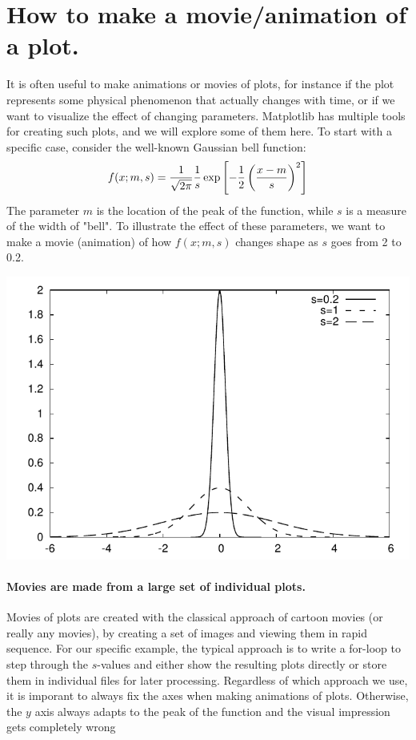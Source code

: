 \documentclass[graybox,envcountchap,sectrefs,final]{svmonodo}
\begin{document}
\section{How to make a movie/animation of a plot.}
It is often useful to make animations or movies of plots, for instance if the plot represents some physical
phenomenon that actually changes with time, or if we want to visualize the effect of changing
parameters. Matplotlib has multiple tools for creating such plots, and we will explore some of them here.
To start with a specific case, consider the well-known Gaussian bell function:
\[ f(x; m, s) = {1\over\sqrt{2\pi}}{1\over s}\exp{\left[-{1\over2}\left({x-m\over s}\right)^2\right]} \]
The parameter $m$ is the location of the peak of the function, while $s$ is a measure of the width of
"bell". To illustrate the effect of these parameters, we want to make a movie (animation) of how
$f(x;m,s)$ changes shape as $s$ goes from 2 to 0.2.




\vspace{6mm}

\centerline{\includegraphics[width=0.8\linewidth]{../chapters/fig-plot/plot4_thick.pdf}}

\vspace{6mm}




\paragraph{Movies are made from a large set of individual plots.}
Movies of plots are created with the classical approach of cartoon movies (or really any movies), by creating a
set of images and viewing them in rapid sequence. For our specific example, the typical approach is to write a
for-loop to step through the $s$-values and either show the resulting plots directly or store them in
individual files for later processing. Regardless of which approach we use, it is imporant to always fix the
axes when making animations of plots. Otherwise, the $y$ axis always adapts to the peak of the function and
the visual impression gets completely wrong
\end{document}

